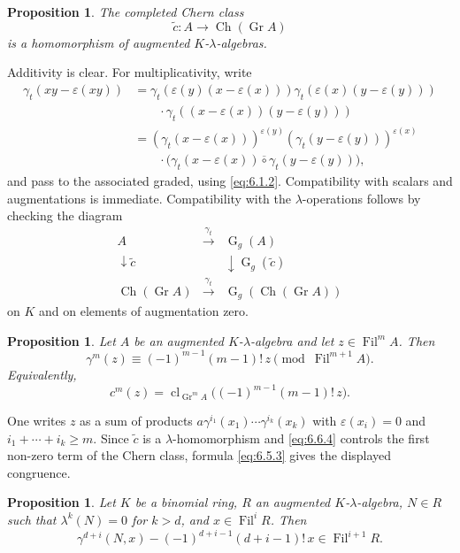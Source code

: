 \documentclass[11pt]{article}
\theoremstyle{plain}
\newtheorem{proposition}[theorem]{Proposition}
\theoremstyle{definition}
\theoremstyle{remark}
\DeclareMathOperator{\Gr}{Gr}
\DeclareMathOperator{\cl}{cl}
\providecommand{\Fil}{\operatorname{Fil}}
\providecommand{\Go}{\operatorname{G}}
\providecommand{\Ch}{\operatorname{Ch}}
\begin{document}
\begin{proposition}\label{prop:6.8}
The completed Chern class
\[
\widetilde c:A\longrightarrow \Ch(\Gr A)
\]
is a homomorphism of augmented $K$-$\lambda$-algebras.
\end{proposition}

Additivity is clear. For multiplicativity, write
\begin{align*}
\gamma_t(xy-\varepsilon(xy))&=\gamma_t(\varepsilon(y)(x-\varepsilon(x)))\gamma_t(\varepsilon(x)(y-\varepsilon(y)))\\
&\qquad\cdot\gamma_t((x-\varepsilon(x))(y-\varepsilon(y)))\\
&=(\gamma_t(x-\varepsilon(x)))^{\varepsilon(y)}(\gamma_t(y-\varepsilon(y)))^{\varepsilon(x)}\\
&\qquad\cdot\bigl(\gamma_t(x-\varepsilon(x))\overline{\circ}\gamma_t(y-\varepsilon(y))\bigr),
\end{align*}
and pass to the associated graded, using \eqref{eq:6.1.2}. Compatibility with scalars and augmentations is immediate. Compatibility with the $\lambda$-operations follows by checking the diagram
\[
\begin{array}{ccc}
A&\xrightarrow{\gamma_t}&\Go_g(A)\\
\downarrow\widetilde c&&\downarrow\Go_g(\widetilde c)\\
\Ch(\Gr A)&\xrightarrow{\gamma_t}&\Go_g(\Ch(\Gr A))
\end{array}
\]
on $K$ and on elements of augmentation zero.

\begin{proposition}\label{prop:6.9}
Let $A$ be an augmented $K$-$\lambda$-algebra and let $z\in\Fil^mA$. Then
\begin{equation}\label{eq:6.9.1}
\gamma^m(z)\equiv(-1)^{m-1}(m-1)!\,z\pmod{\Fil^{m+1}A}.
\end{equation}
Equivalently,
\[
c^m(z)=\cl_{\Gr^mA}\bigl((-1)^{m-1}(m-1)!\,z\bigr).
\]
\end{proposition}

One writes $z$ as a sum of products $a\gamma^{i_1}(x_1)\cdots\gamma^{i_k}(x_k)$ with $\varepsilon(x_i)=0$ and $i_1+\cdots+i_k\geq m$. Since $\widetilde c$ is a $\lambda$-homomorphism and \eqref{eq:6.6.4} controls the first non-zero term of the Chern class, formula \eqref{eq:6.5.3} gives the displayed congruence.

\begin{proposition}\label{prop:6.10}
Let $K$ be a binomial ring, $R$ an augmented $K$-$\lambda$-algebra, $N\in R$ such that $\lambda^k(N)=0$ for $k>d$, and $x\in\Fil^iR$. Then
\begin{equation}\label{eq:6.10}
\gamma^{d+i}(N,x)-(-1)^{d+i-1}(d+i-1)!\,x\in\Fil^{i+1}R.
\end{equation}
\end{proposition}
\end{document}

